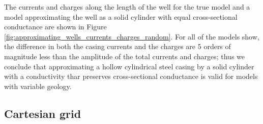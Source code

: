 

The currents and charges along the length of the well for the true model and a model approximating the well as a solid cylinder with equal cross-sectional conductance are shown in Figure \ref{fig:approximating_wells_currents_charges_random}. For all of the models show, the difference in both the casing currents and the charges are 5 orders of magnitude less than the amplitude of the total currents and charges; thus we conclude that approximating a hollow cylindrical steel casing by a solid cylinder with a conductivity thar preserves cross-sectional conductance is valid for models with variable geology.



\subsection{Cartesian grid}
